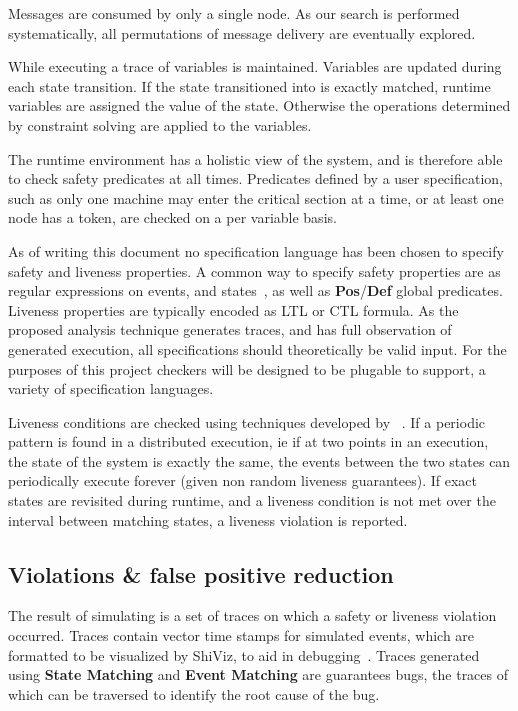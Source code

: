 Messages are consumed by only a single node. As our search is performed
systematically, all permutations of message delivery are eventually explored. 

While executing a trace of variables is maintained. Variables are updated during
each state transition. If the state transitioned into is exactly matched,
runtime variables are assigned the value of the state. Otherwise the operations
determined by constraint solving are applied to the variables.

The runtime environment has a holistic view of the system, and is therefore
able to check safety predicates at all times. Predicates defined by a user
specification, such as only one machine may enter the critical section at a
time, or at least one node has a token, are checked on a per variable basis.

As of writing this document no specification language has been chosen to
specify safety and liveness properties. A common way to specify safety properties
are as regular expressions on events, and states~\cite{5727765}, as well as
\textbf{Pos}/\textbf{Def} global predicates. Liveness properties are typically
encoded as LTL or CTL formula. As the proposed analysis technique generates
traces, and has full observation of generated execution, all specifications
should theoretically be valid input. For the purposes of this project checkers
will be designed to be plugable to support, a variety of specification
languages.

Liveness conditions are checked using techniques developed by
~\cite{Garg:2014:MAS:2580115.2580404}. If a periodic pattern is found in a
distributed execution, ie if at two points in an execution, the state of the
system is exactly the same, the events between the two states can periodically
execute forever (given non random liveness guarantees). If exact states are
revisited during runtime, and a liveness condition is not met over the interval
between matching states, a liveness violation is reported.

\subsection{Violations \& false positive reduction}

The result of simulating is a set of traces on which a safety or liveness
violation occurred. Traces contain vector time stamps for simulated events,
which are formatted to be visualized by ShiViz, to aid in
debugging~\cite{Abrahamson_sheddinglight}. Traces generated using \textbf{State
Matching} and \textbf{Event Matching} are guarantees bugs, the traces of which
can be traversed to identify the root cause of the bug. 

